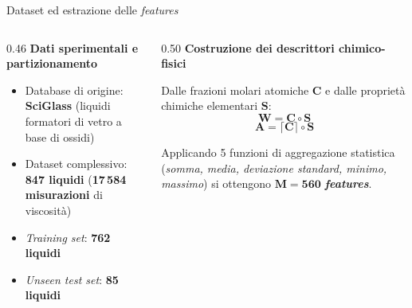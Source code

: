\documentclass[10pt, aspectratio=169, table]{beamer}
\begin{document}
	\begin{frame}{Dataset ed estrazione delle \textit{features}}
		\begin{columns}[T]
			\begin{column}{0.46\textwidth}
				\small
				\textbf{Dati sperimentali e partizionamento}
				\vspace{0.2cm}
				\begin{itemize}
					\item Database di origine: \textbf{SciGlass} (liquidi formatori di vetro a base di ossidi)
					\vspace{0.15cm}
					\item Dataset complessivo: \textbf{847 liquidi} (\textbf{17\,584 misurazioni} di viscosità)
					\vspace{0.15cm}
					\item \textit{Training set}: \textbf{762 liquidi}
					\vspace{0.15cm}
					\item \textit{Unseen test set}: \textbf{85 liquidi}
				\end{itemize}
			\end{column}
			\begin{column}{0.50\textwidth}
				\small
				\textbf{Costruzione dei descrittori chimico-fisici}
				\vspace{0.2cm}
				
				Dalle frazioni molari atomiche $\boldsymbol{C}$ e dalle proprietà chimiche elementari $\boldsymbol{S}$:
				$$\boldsymbol{W} = \boldsymbol{C} \circ \boldsymbol{S}$$
				$$\boldsymbol{A} = \lceil \boldsymbol{C} \rceil \circ \boldsymbol{S}$$
				
				\vspace{0.2cm}
				Applicando 5 funzioni di aggregazione statistica (\textit{somma, media, deviazione standard, minimo, massimo}) si ottengono $\mathbf{M = 560}$ \textbf{\textit{features}}.
			\end{column}
		\end{columns}
	\end{frame}
	
\end{document}

